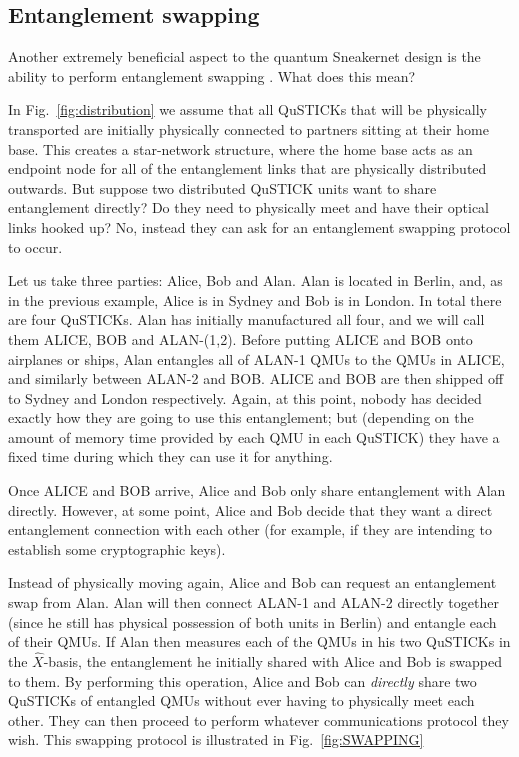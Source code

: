 \documentclass[twocolumn, aps, rmp, amsmath, amssymb, nofootinbib, superscriptaddress, longbibliography, floatfix, table-of-contents, eqsecnum]{revtex4-2}
\begin{document}
\subsection{Entanglement swapping}

Another extremely beneficial aspect to the quantum Sneakernet design is the ability to perform entanglement swapping \cite{SD-Zukowski:1993aa}. What does this mean? 

In Fig.~\ref{fig:distribution} we assume that all QuSTICKs that will be physically transported are initially physically connected to partners sitting at their home base. This creates a star-network structure, where the home base acts as an endpoint node for all of the entanglement links that are physically distributed outwards. But suppose two distributed QuSTICK units want to share entanglement directly? Do they need to physically meet and have their optical links hooked up? No, instead they can ask for an entanglement swapping protocol to occur. 

Let us take three parties: Alice, Bob and Alan. Alan is located in Berlin, and, as in the previous example, Alice is in Sydney and Bob is in London. In total there are four QuSTICKs. Alan has initially manufactured all four, and we will call them ALICE, BOB and ALAN-(1,2). Before putting ALICE and BOB onto airplanes or ships, Alan entangles all of ALAN-1 QMUs to the QMUs in ALICE, and similarly between ALAN-2 and BOB. ALICE and BOB are then shipped off to Sydney and London respectively. Again, at this point, nobody has decided exactly how they are going to use this entanglement; but (depending on the amount of memory time provided by each QMU in each QuSTICK) they have a fixed time during which they can use it for anything. 

Once ALICE and BOB arrive, Alice and Bob only share entanglement with Alan directly. However, at some point, Alice and Bob decide that they want a direct entanglement connection with each other (for example, if they are intending to establish some cryptographic keys).

Instead of physically moving again, Alice and Bob can request an entanglement swap from Alan. Alan will then connect ALAN-1 and ALAN-2 directly together (since he still has physical possession of both units in Berlin) and entangle each of their QMUs. If Alan then measures each of the QMUs in his two QuSTICKs in the $\hat{X}$-basis, the entanglement he initially shared with Alice and Bob is swapped to them. By performing this operation, Alice and Bob can \textit{directly} share two QuSTICKs of entangled QMUs without ever having to physically meet each other. They can then proceed to perform whatever communications protocol they wish. This swapping protocol is illustrated in Fig.~\ref{fig:SWAPPING} 
\end{document}
